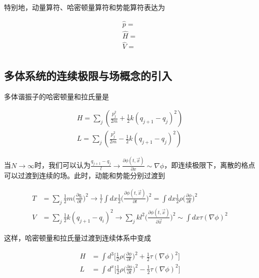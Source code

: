 特别地，动量算符、哈密顿量算符和势能算符表达为

\begin{equation}
	\begin{array}{lr}
		\hat{p}= \\
		\hat{H}= \\
		\hat{V}= \\
	\end{array}
\end{equation}




\subsection{多体系统的连续极限与场概念的引入}

多体谐振子的哈密顿量和拉氏量是

\begin{equation}
	\begin{array}{lr}
		H=\sum_{j}(\frac{p_j^2}{2m}+\frac{1}{2}k(q_{j+1}-q_j)^2) \\
		L=\sum_{j}(\frac{p_j^2}{2m}-\frac{1}{2}k(q_{j+1}-q_j)^2)
	\end{array}
\end{equation}

当$N\to\infty$时，我们可以认为$\frac{q_{j+1}-q_j}{l}\to\frac{\partial\phi(t,\vec{x})}{\partial x}\sim\nabla\phi$，即连续极限下，离散的格点可以过渡到连续的场。此时，动能和势能分别过渡到

\begin{equation}
    \begin{split}
        T &= \sum_j\frac{1}{2}m\bigl(\frac{\partial q_i}{\partial t}\bigr)^2 \to \frac{1}{l}\int dx\frac{1}{2}\bigl(\frac{\partial\phi(t,\vec{x})}{\partial t}\bigr)^2 = \int dx\frac{1}{2}\rho\bigl(\frac{\partial\phi}{\partial t}\bigr)^2 \\
        V &= \sum_j\frac{1}{2}k(q_{j+1}-q_i)^2 \to \sum_jkl^2\bigl(\frac{\partial\phi(t,\vec{x})}{\partial \vec{x}}\bigr)^2 \sim \int dx \tau(\nabla\phi)^2
    \end{split}
\end{equation}

这样，哈密顿量和拉氏量过渡到连续体系中变成

\begin{equation}
    \begin{split}
        H &= \int d^3\bigl[\frac{1}{2}\rho\bigl(\frac{\partial\phi}{\partial t}\bigr)^2+\frac{1}{2}\tau(\nabla\phi)^2\bigr] \\
        L &= \int d^x\bigl[\frac{1}{2}\rho\bigl(\frac{\partial\phi}{\partial t}\bigr)^2-\frac{1}{2}\tau(\nabla\phi)^2\bigr]
    \end{split}
\end{equation}

